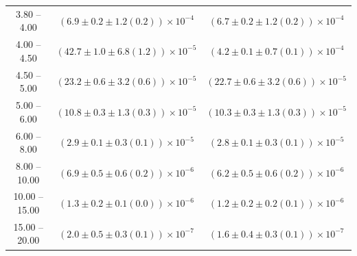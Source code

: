 \begin{table}
\begin{center}
\begin{tabular}{ c | c c }
3.80 -- 4.00 & $(6.9\pm0.2\pm1.2(0.2))\times10^{-4}$ & $(6.7\pm0.2\pm1.2(0.2))\times10^{-4}$ \\ 
4.00 -- 4.50 & $(42.7\pm1.0\pm6.8(1.2))\times10^{-5}$ & $(4.2\pm0.1\pm0.7(0.1))\times10^{-4}$ \\ 
4.50 -- 5.00 & $(23.2\pm0.6\pm3.2(0.6))\times10^{-5}$ & $(22.7\pm0.6\pm3.2(0.6))\times10^{-5}$ \\ 
5.00 -- 6.00 & $(10.8\pm0.3\pm1.3(0.3))\times10^{-5}$ & $(10.3\pm0.3\pm1.3(0.3))\times10^{-5}$ \\ 
6.00 -- 8.00 & $(2.9\pm0.1\pm0.3(0.1))\times10^{-5}$ & $(2.8\pm0.1\pm0.3(0.1))\times10^{-5}$ \\ 
8.00 -- 10.00 & $(6.9\pm0.5\pm0.6(0.2))\times10^{-6}$ & $(6.2\pm0.5\pm0.6(0.2))\times10^{-6}$ \\ 
10.00 -- 15.00 & $(1.3\pm0.2\pm0.1(0.0))\times10^{-6}$ & $(1.2\pm0.2\pm0.2(0.1))\times10^{-6}$ \\ 
15.00 -- 20.00 & $(2.0\pm0.5\pm0.3(0.1))\times10^{-7}$ & $(1.6\pm0.4\pm0.3(0.1))\times10^{-7}$ \\ 
\hline
\end{tabular}
\end{center}
\end{table}
 
